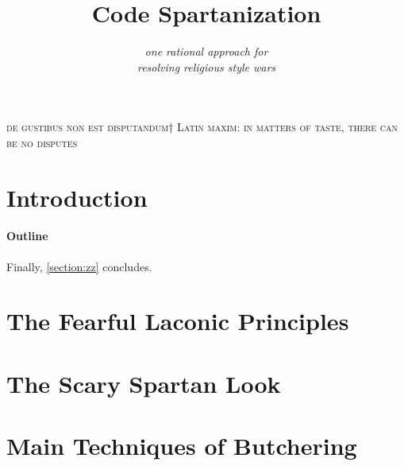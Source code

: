 \documentclass[preprint,10pt,nonatbib]{sigplanconf}
\title{Code Spartanization}
\subtitle{\scriptsize \emph{one rational approach for \\ resolving  religious style wars}}
\begin{document}
\textsc{de gustibus non est disputandum†{%
    Latin maxim: in matters of taste, there can be no disputes
}}
{\let\newpage\relax\maketitle}
\begin{flushright}
  \begin{minipage}{2.5in}
    \normalsize \rmfamily\scshape
    \color{red}{%
      suum cuique \newline
      Tu mortale, essere avvertiti. \newline
      Tu non Shallt Rimuovere \newline
      Questo comandamento \newline
      Mentre ci sono segni di Haste \newline
      in questo documento !!!! \newline
    }
  \end{minipage}
\end{flushright}

\begin{abstract}
  
\end{abstract}
\section{Introduction}


\paragraph{Outline}
\label{section:principia}
\label{section:techniques}
\label{section:look}
\label{section:jack}
\label{section:look}
\label{section:initial}
\label{section:zz}
Finally, \cref{section:zz} concludes.

\section{The Fearful Laconic Principles}
\label{section:principia}


\section{The Scary Spartan Look}
\label{section:look}


\section{Main Techniques of Butchering}
\label{section:techniques}

\end{document}
